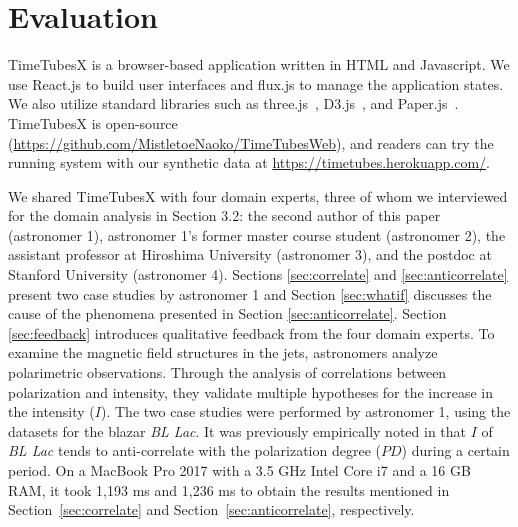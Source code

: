 \section{Evaluation\label{sec:evaluation}}
TimeTubesX is a browser-based application written in HTML and Javascript.
We use React.js to build user interfaces and flux.js to manage the application states.
We also utilize standard libraries such as three.js~\cite{three_framework}, D3.js~\cite{d3_framework}, and Paper.js~\cite{paper_framework}.
TimeTubesX is open-source (\url{https://github.com/MistletoeNaoko/TimeTubesWeb}), and 
readers can try the running system with our synthetic data at \url{https://timetubes.herokuapp.com/}.

We shared TimeTubesX with four domain experts, three of whom we interviewed for the domain analysis in Section 3.2: the second author of this paper (astronomer 1), astronomer 1’s former master course student (astronomer 2), the assistant professor at Hiroshima University (astronomer 3), and the postdoc at Stanford University (astronomer 4). Sections \ref{sec:correlate} and \ref{sec:anticorrelate} present two case studies by astronomer 1 and Section \ref{sec:whatif} discusses the cause of the phenomena presented in Section \ref{sec:anticorrelate}. Section \ref{sec:feedback} introduces qualitative feedback from the four domain experts.
To examine the magnetic field structures in the jets, 
astronomers analyze polarimetric observations. 
Through the analysis of correlations between polarization and intensity, 
they validate multiple hypotheses for the increase in the intensity ($I$). 
The two case studies were performed by astronomer 1, using the datasets for the blazar \emph{BL Lac}. 
It was previously empirically noted in \cite{Gaur2014} that $I$ of \emph{BL Lac} tends to anti-correlate with the polarization degree ($PD$) during a certain period.
On a MacBook Pro 2017 with a 3.5 GHz Intel Core i7 and a 16 GB RAM, it took 1{,}193 ms and 1{,}236 ms to obtain the results mentioned in Section~\ref{sec:correlate} and Section~\ref{sec:anticorrelate}, respectively.
%

